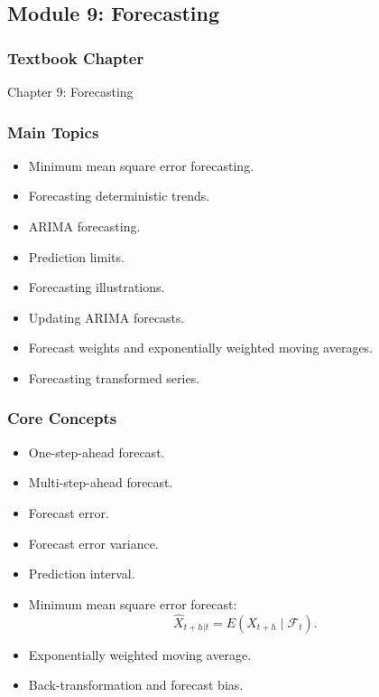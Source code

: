 \documentclass[11pt]{article}
\begin{document}
\subsection{Module 9: Forecasting}

\subsubsection*{Textbook Chapter}
Chapter 9: Forecasting

\subsubsection*{Main Topics}
\begin{itemize}
    \item Minimum mean square error forecasting.
    \item Forecasting deterministic trends.
    \item ARIMA forecasting.
    \item Prediction limits.
    \item Forecasting illustrations.
    \item Updating ARIMA forecasts.
    \item Forecast weights and exponentially weighted moving averages.
    \item Forecasting transformed series.
\end{itemize}

\subsubsection*{Core Concepts}
\begin{itemize}
    \item One-step-ahead forecast.
    \item Multi-step-ahead forecast.
    \item Forecast error.
    \item Forecast error variance.
    \item Prediction interval.
    \item Minimum mean square error forecast:
    \[
        \hat{X}_{t+h|t} = E(X_{t+h}\mid \mathcal{F}_t).
    \]
    \item Exponentially weighted moving average.
    \item Back-transformation and forecast bias.
\end{itemize}
\end{document}
